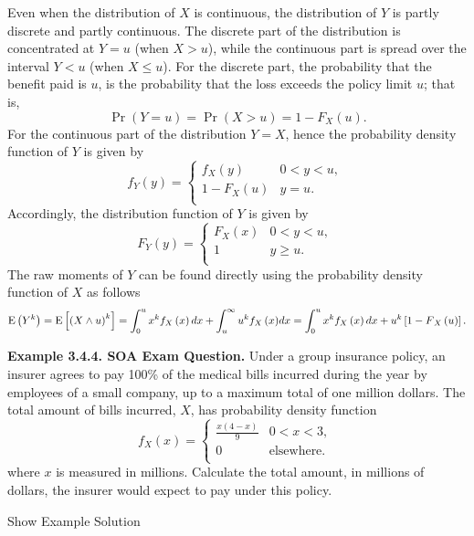 \documentclass[]{book}
\theoremstyle{definition}
\theoremstyle{definition}
\theoremstyle{definition}
\theoremstyle{remark}
\begin{document}
Even when the distribution of \(X\) is continuous, the distribution of
\(Y\) is partly discrete and partly continuous. The discrete part of the
distribution is concentrated at \(Y = u\) (when \(X > u\)), while the
continuous part is spread over the interval \(Y < u\) (when
\(X \leq u\)). For the discrete part, the probability that the benefit
paid is \(u\), is the probability that the loss exceeds the policy limit
\(u\); that is,
\[\Pr \left( Y = u \right) = \Pr \left( X > u \right) = {1 - F}_{X}\left( u \right).\]
For the continuous part of the distribution \(Y = X\), hence the
probability density function of \(Y\) is given by
\[f_{Y}\left( y \right) = \left\{ \begin{matrix}
f_{X}\left( y \right) & 0 < y < u, \\
1 - F_{X}\left( u \right) & y = u. \\
\end{matrix} \right.\ \] Accordingly, the distribution function of \(Y\)
is given by \[F_{Y}\left( y \right) = \left\{ \begin{matrix}
F_{X}\left( x \right) & 0 < y < u, \\
1 & y \geq u. \\
\end{matrix} \right.\ \] The raw moments of \(Y\) can be found directly
using the probability density function of \(X\) as follows
\[\mathrm{E}\left( Y^{k} \right) = \mathrm{E}\left\lbrack \left( X \land u \right)^{k} \right\rbrack = \int_{0}^{u}x^{k}f_{X}\left( x \right)dx + \int_{u}^{\infty}{u^{k}f_{X}\left( x \right)} dx \\ = \int_{0}^{u}x^{k}f_{X}\left( x \right)dx + u^{k}\left\lbrack {1 - F}_{X}\left( u \right) \right\rbrack .\]

\textbf{Example 3.4.4. SOA Exam Question.} Under a group insurance
policy, an insurer agrees to pay 100\% of the medical bills incurred
during the year by employees of a small company, up to a maximum total
of one million dollars. The total amount of bills incurred, \(X\), has
probability density function
\[f_{X}\left( x \right) = \left\{ \begin{matrix}
\frac{x\left( 4 - x \right)}{9} & 0 < x < 3, \\
0 & \text{elsewhere.} \\
\end{matrix} \right.\ \] where \(x\) is measured in millions. Calculate
the total amount, in millions of dollars, the insurer would expect to
pay under this policy.

Show Example Solution
\end{document}
